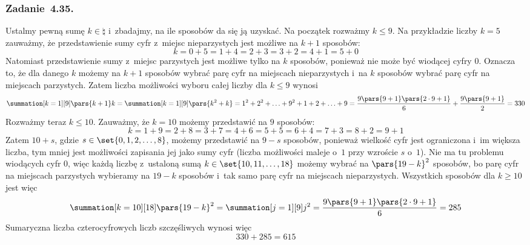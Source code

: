 \subsubsection*{Zadanie~4.35.}
Ustalmy pewną sumę \(k \in \natural\) i~zbadajmy, na ile sposobów da się ją uzyskać. Na początek rozważmy \(k \leq 9\). Na przykładzie liczby \(k = 5\) zauważmy, że przedstawienie sumy cyfr z~miejsc nieparzystych jest możliwe na \(k + 1\) sposobów:
\begin{equation*}
    k = 0 + 5 = 1 + 4 = 2 + 3 = 3 + 2 = 4 + 1 = 5 + 0
\end{equation*}
Natomiast przedstawienie sumy z~miejsc parzystych jest możliwe tylko na \(k\) sposobów, ponieważ nie może być wiodącej cyfry \(0\). Oznacza to, że dla danego \(k\) możemy na \(k + 1\) sposobów wybrać parę cyfr na miejscach nieparzystych i~na \(k\) sposobów wybrać parę cyfr na miejscach parzystych. Zatem liczba możliwości wyboru całej liczby dla \(k \leq 9\) wynosi
\begin{equation*}
    \summation[k = 1][9] \pars{k + 1}k
        = \summation[k = 1][9] \pars{k^2 + k}
        = 1^2 + 2^2 + \ldots + 9^2 + 1 + 2 + \ldots + 9
        = \frac{9\pars{9 + 1}\pars{2 \cdot 9 + 1}}{6} + \frac{9\pars{9 + 1}}{2}
        = 330
\end{equation*}
Rozważmy teraz \(k \leq 10\). Zauważmy, że \(k = 10\) możemy przedstawić na \(9\) sposobów:
\begin{equation*}
    k = 1 + 9 = 2 + 8 = 3 + 7 = 4 + 6 = 5 + 5 = 6 + 4 = 7 + 3 = 8 + 2 = 9 + 1
\end{equation*}
Zatem \(10 + s\), gdzie \(s \in \set{0, 1, 2, \ldots, 8}\), możemy przedstawić na \(9 - s\) sposobów, ponieważ wielkość cyfr jest ograniczona i~im większa liczba, tym mniej jest możliwości zapisania jej jako sumy cyfr (liczba możliwości maleje o~\(1\) przy wzroście \(s\) o~\(1\)). Nie ma tu problemu wiodących cyfr \(0\), więc każdą liczbę z~ustaloną sumą \(k \in \set{10, 11, \ldots, 18}\) możemy wybrać na \(\pars{19 - k}^2\) sposobów, bo parę cyfr na miejscach parzystych wybieramy na \(19 - k\) sposobów i~tak samo parę cyfr na miejscach nieparzystych. Wszystkich sposobów dla \(k \geq 10\) jest więc
\begin{equation*}
    \summation[k = 10][18] \pars{19 - k}^2
        = \summation[j = 1][9] j^2
        = \frac{9\pars{9 + 1}\pars{2 \cdot 9 + 1}}{6}
        = 285
\end{equation*}
Sumaryczna liczba czterocyfrowych liczb szczęśliwych wynosi więc
\begin{equation*}
    330 + 285
        = 615
\end{equation*}
